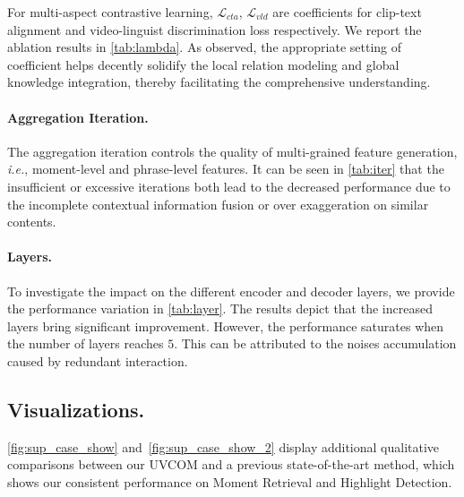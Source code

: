 \documentclass[10pt,twocolumn,letterpaper]{article}
\begin{document}
For multi-aspect contrastive learning, $\mathcal{L}_{cta}$, $\mathcal{L}_{vld}$ are coefficients for clip-text alignment and video-linguist discrimination loss respectively. We report the ablation results in \cref{tab:lambda}. As observed, the appropriate setting of coefficient helps decently solidify the local relation modeling and global knowledge integration, thereby facilitating the comprehensive understanding. 

\paragraph{Aggregation Iteration.} The aggregation iteration controls the quality of multi-grained feature generation, \textit{i.e.}, moment-level and phrase-level features. It can be seen in \cref{tab:iter} that the insufficient or excessive iterations both lead to the decreased performance due to the incomplete contextual information fusion or over exaggeration on similar contents. 

\paragraph{Layers.} To investigate the impact on the different encoder and decoder layers, we provide the performance variation in \cref{tab:layer}. The results depict that the increased layers bring significant improvement. However, the performance saturates when the number of layers reaches $5$. This can be attributed to the noises accumulation caused by redundant interaction.

\subsection{Visualizations.}
\cref{fig:sup_case_show} and~\cref{fig:sup_case_show_2} display additional qualitative comparisons between our UVCOM and a previous state-of-the-art method, which shows our consistent performance on Moment Retrieval and Highlight Detection. 
 
\end{document}
